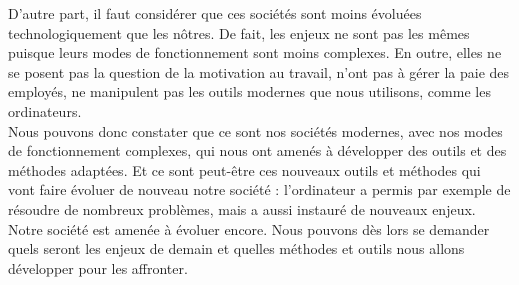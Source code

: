 D'autre part, il faut considérer que ces sociétés sont moins évoluées technologiquement que les nôtres. De fait, les enjeux ne sont pas les mêmes puisque leurs modes de fonctionnement sont moins complexes. En outre, elles ne se posent pas la question de la motivation au travail, n'ont pas à gérer la paie des employés, ne manipulent pas les outils modernes que nous utilisons, comme les ordinateurs.\\

Nous pouvons donc constater que ce sont nos sociétés modernes, avec nos modes de fonctionnement complexes, qui nous ont amenés à développer des outils et des méthodes adaptées. Et ce sont peut-être ces nouveaux outils et méthodes qui vont faire évoluer de nouveau notre société : l'ordinateur a permis par exemple de résoudre de nombreux problèmes, mais a aussi instauré de nouveaux enjeux.\\

Notre société est amenée à évoluer encore. Nous pouvons dès lors se demander quels seront les enjeux de demain et quelles méthodes et outils nous allons développer pour les affronter.
